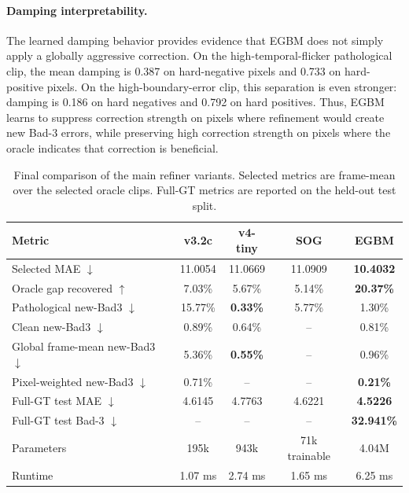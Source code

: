 \documentclass[11pt,a4paper]{article}
\begin{document}
\paragraph{Damping interpretability.}
The learned damping behavior provides evidence that EGBM does not simply apply a
globally aggressive correction. On the high-temporal-flicker pathological clip,
the mean damping is 0.387 on hard-negative pixels and 0.733 on hard-positive
pixels. On the high-boundary-error clip, this separation is even stronger:
damping is 0.186 on hard negatives and 0.792 on hard positives. Thus, EGBM
learns to suppress correction strength on pixels where refinement would create
new Bad-3 errors, while preserving high correction strength on pixels where the
oracle indicates that correction is beneficial.

\begin{table}[t]
\centering
\caption{Final comparison of the main refiner variants. Selected metrics are
frame-mean over the selected oracle clips. Full-GT metrics are reported on the
held-out test split.}
\label{tab:final_refiner_comparison}
\begin{tabular}{lcccc}
\toprule
Metric & v3.2c & v4-tiny & SOG & EGBM \\
\midrule
Selected MAE $\downarrow$ & 11.0054 & 11.0669 & 11.0909 & \textbf{10.4032} \\
Oracle gap recovered $\uparrow$ & 7.03\% & 5.67\% & 5.14\% & \textbf{20.37\%} \\
Pathological new-Bad3 $\downarrow$ & 15.77\% & \textbf{0.33\%} & 5.77\% & 1.30\% \\
Clean new-Bad3 $\downarrow$ & 0.89\% & 0.64\% & -- & 0.81\% \\
Global frame-mean new-Bad3 $\downarrow$ & 5.36\% & \textbf{0.55\%} & -- & 0.96\% \\
Pixel-weighted new-Bad3 $\downarrow$ & 0.71\% & -- & -- & \textbf{0.21\%} \\
Full-GT test MAE $\downarrow$ & 4.6145 & 4.7763 & 4.6221 & \textbf{4.5226} \\
Full-GT test Bad-3 $\downarrow$ & -- & -- & -- & \textbf{32.941\%} \\
Parameters & 195k & 943k & 71k trainable & 4.04M \\
Runtime & 1.07 ms & 2.74 ms & 1.65 ms & 6.25 ms \\
\bottomrule
\end{tabular}
\end{table}
\end{document}
